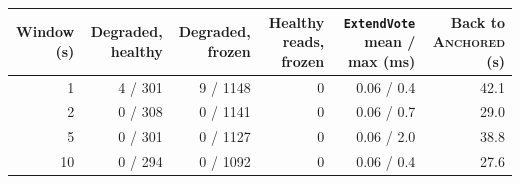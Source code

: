 \begin{tabular}{@{}rrrrrr@{}}
\toprule
\textbf{Window (s)} & \textbf{Degraded, healthy} & \textbf{Degraded, frozen} & \textbf{Healthy reads, frozen} & \texttt{ExtendVote} mean / max (ms) & \textbf{Back to \textsc{Anchored} (s)} \\
\midrule
1 & 4 / 301 & 9 / 1148 & 0 & 0.06 / 0.4 & 42.1 \\
2 & 0 / 308 & 0 / 1141 & 0 & 0.06 / 0.7 & 29.0 \\
5 & 0 / 301 & 0 / 1127 & 0 & 0.06 / 2.0 & 38.8 \\
10 & 0 / 294 & 0 / 1092 & 0 & 0.06 / 0.4 & 27.6 \\
\bottomrule
\end{tabular}
